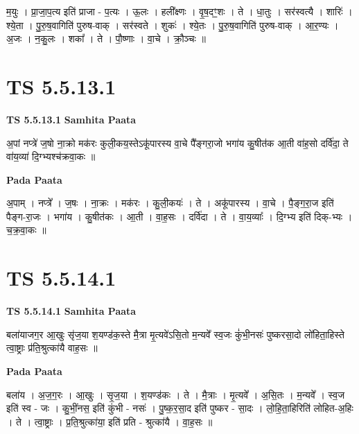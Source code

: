 \documentclass[17pt]{extarticle}
\begin{document}
म॒युः । प्रा॒जा॒प॒त्य इति॑ प्राजा - प॒त्यः । ऊ॒लः । हली᳚क्ष्णः । वृ॒ष॒दꣳ॒॒शः । ते । धा॒तुः । सर॑स्वत्यै । शारिः॑ । श्ये॒ता । पु॒रु॒ष॒वागिति॑ पुरुष-वाक् । सर॑स्वते । शुकः॑ । श्ये॒तः । पु॒रु॒ष॒वागिति॑ पुरुष-वाक् । आ॒र॒ण्यः । अ॒जः । न॒कु॒लः । शका᳚ । ते । पौ॒ष्णाः । वा॒चे । क्रौ॒ञ्चः ॥  \newline





\section{ TS 5.5.13.1 }

\textbf{TS 5.5.13.1 } \newline
\textbf{Samhita Paata} \newline

अ॒पां नप्त्रे॑ ज॒षो ना॒क्रो मक॑रः कुली॒कय॒स्तेऽकू॑पारस्य वा॒चे पै᳚ङ्गरा॒जो भगा॑य कु॒षीत॑क आ॒ती वा॑ह॒सो दर्वि॑दा॒ ते वा॑य॒व्या॑ दि॒ग्भ्यश्च॑क्रवा॒कः ॥ \newline

\textbf{Pada Paata} \newline

अ॒पाम् । नप्त्रे᳚ । ज॒षः । ना॒क्रः । मक॑रः । कु॒ली॒कयः॑ । ते । अकू॑पारस्य । वा॒चे । पै॒ङ्ग॒रा॒ज इति॑ पैङ्ग-रा॒जः । भगा॑य । कु॒षीत॑कः । आ॒ती । वा॒ह॒सः । दर्वि॑दा । ते । वा॒य॒व्याः᳚ । दि॒ग्भ्य इति॑ दिक्-भ्यः । च॒क्र॒वा॒कः ॥  \newline





\section{ TS 5.5.14.1 }

\textbf{TS 5.5.14.1 } \newline
\textbf{Samhita Paata} \newline

बला॑याजग॒र आ॒खुः सृ॑ज॒या श॒यण्ड॑क॒स्ते मै॒त्रा मृ॒त्यवे॑ऽसि॒तो म॒न्यवे᳚ स्व॒जः कुं॑भी॒नसः॑ पुष्करसा॒दो लो॑हिता॒हिस्ते त्वा॒ष्ट्राः प्र॑ति॒श्रुत्का॑यै वाह॒सः ॥ \newline

\textbf{Pada Paata} \newline

बला॑य । अ॒ज॒ग॒रः । आ॒खुः । सृ॒ज॒या । श॒यण्ड॑कः । ते । मै॒त्राः । मृ॒त्यवे᳚ । अ॒सि॒तः । म॒न्यवे᳚ । स्व॒ज इति॑ स्व - जः । कु॒भीं॒नस॒ इति॑ कुंभी - नसः॑ । पु॒ष्क॒र॒सा॒द इति॑ पुष्कर - सा॒दः । लो॒हि॒ता॒हिरिति॑ लोहित-अ॒हिः । ते । त्वा॒ष्ट्राः । प्र॒ति॒श्रुत्का॑या॒ इति॑ प्रति - श्रुत्का॑यै । वा॒ह॒सः ॥  \newline
\end{document}

